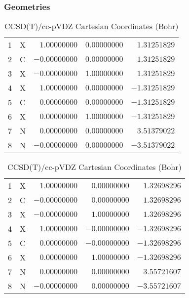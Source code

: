 \documentclass[10pt,oneside]{article}
\begin{document}
\begin{table}[h!]
\subsubsection*{Geometries}
\begin{multicols}{2}
\centering
\caption{CCSD(T)/cc-pVTZ Cartesian Coordinates (Bohr)}
\begin{tabular}{llrrr}
\toprule
1  & X  & $ 1.00000000$ & $ 0.00000000$ & $ 1.31251829$ \\
2  & C  & $-0.00000000$ & $ 0.00000000$ & $ 1.31251829$ \\
3  & X  & $-0.00000000$ & $ 1.00000000$ & $ 1.31251829$ \\
4  & X  & $ 1.00000000$ & $ 0.00000000$ & $-1.31251829$ \\
5  & C  & $ 0.00000000$ & $ 0.00000000$ & $-1.31251829$ \\
6  & X  & $ 0.00000000$ & $ 1.00000000$ & $-1.31251829$ \\
7  & N  & $ 0.00000000$ & $ 0.00000000$ & $ 3.51379022$ \\
8  & N  & $-0.00000000$ & $ 0.00000000$ & $-3.51379022$ \\
\bottomrule
\end{tabular}
\caption{CCSD(T)/cc-pVDZ Cartesian Coordinates (Bohr)}
\begin{tabular}{llrrr}
\toprule
1  & X  & $ 1.00000000$ & $ 0.00000000$ & $ 1.32698296$ \\
2  & C  & $-0.00000000$ & $ 0.00000000$ & $ 1.32698296$ \\
3  & X  & $-0.00000000$ & $ 1.00000000$ & $ 1.32698296$ \\
4  & X  & $ 1.00000000$ & $-0.00000000$ & $-1.32698296$ \\
5  & C  & $ 0.00000000$ & $-0.00000000$ & $-1.32698296$ \\
6  & X  & $ 0.00000000$ & $ 1.00000000$ & $-1.32698296$ \\
7  & N  & $ 0.00000000$ & $ 0.00000000$ & $ 3.55721607$ \\
8  & N  & $-0.00000000$ & $ 0.00000000$ & $-3.55721607$ \\
\bottomrule
\end{tabular}
\end{multicols}
\end{table}
\end{document}
